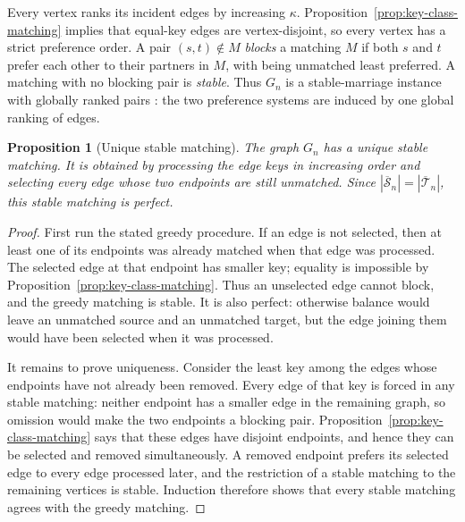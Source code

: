 \documentclass[11pt]{amsart}
\newtheorem{proposition}[theorem]{Proposition}
\theoremstyle{definition}
\theoremstyle{remark}
\newcommand{\Sbar}{\overline{\mathcal S}_n}
\newcommand{\Tbar}{\overline{\mathcal T}_n}
\begin{document}
Every vertex ranks its incident edges by increasing $\kappa$.
Proposition~\ref{prop:key-class-matching} implies that equal-key edges are
vertex-disjoint, so every vertex has a strict preference order.  A pair
$(s,t)\notin M$ \emph{blocks} a matching $M$ if both $s$ and $t$ prefer each
other to their partners in $M$, with being unmatched least preferred.  A
matching with no blocking pair is \emph{stable}.  Thus $G_n$ is a
stable-marriage instance with globally ranked pairs
\cite{GaleShapley,GusfieldIrving,AbrahamEtAl}: the two preference systems are
induced by one global ranking of edges.

\begin{proposition}[Unique stable matching]\label{prop:unique-stable}
The graph $G_n$ has a unique stable matching.  It is obtained by processing
the edge keys in increasing order and selecting every edge whose two
endpoints are still unmatched.  Since $|\Sbar|=|\Tbar|$, this stable matching
is perfect.
\end{proposition}

\begin{proof}
First run the stated greedy procedure.  If an edge is not selected, then at
least one of its endpoints was already matched when that edge was processed.
The selected edge at that endpoint has smaller key; equality is impossible
by Proposition~\ref{prop:key-class-matching}.  Thus an unselected edge cannot
block, and the greedy matching is stable.  It is also perfect: otherwise
balance would leave an unmatched source and an unmatched target, but the edge
joining them would have been selected when it was processed.

It remains to prove uniqueness.  Consider the least key among the edges whose
endpoints have not already been removed.  Every edge of that key is forced in
any stable matching: neither endpoint has a smaller edge in the remaining
graph, so omission would make the two endpoints a blocking pair.
Proposition~\ref{prop:key-class-matching} says that these edges have disjoint
endpoints, and hence they can be selected and removed simultaneously.
A removed endpoint prefers its selected edge to every edge processed later,
and the restriction of a stable matching to the remaining vertices is stable.
Induction therefore shows that every stable matching agrees with the greedy
matching.
\end{proof}
\end{document}
